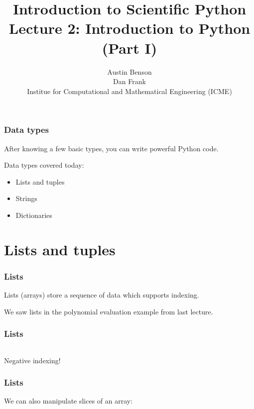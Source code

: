 \documentclass{beamer}
\title{Introduction to Scientific Python \\
Lecture 2: Introduction to Python (Part I)}
\author{Austin Benson \\
\vspace{0.1in}
Dan Frank \\
\vspace{0.1in}
Institue for Computational and Mathematical Engineering (ICME)}
\begin{document}
\maketitle

\begin{frame}
\frametitle{Data types}

After knowing a few basic types, you can write powerful Python code.

\vspace{0.1in}

Data types covered today:
\begin{itemize}
\setlength{\itemsep}{0.1in}
\item{Lists and tuples}
\item{Strings}
\item{Dictionaries}
\end{itemize}

\end{frame}

\section{Lists and tuples}

\begin{frame}
\frametitle{Lists}

Lists (arrays) store a sequence of data which supports indexing.

\vspace{0.1in}

We saw lists in the polynomial evaluation example from last lecture.

\end{frame}

\begin{frame}
\frametitle{Lists}

\begin{tabular}{l}

\end{tabular}

\vspace{0.1in}

Negative indexing!

\end{frame}

\begin{frame}
\frametitle{Lists}
We can also manipulate slices of an array:

\begin{center}
\begin{tabular}{c}

\end{tabular}
\end{center}

\end{frame}
\end{document}
